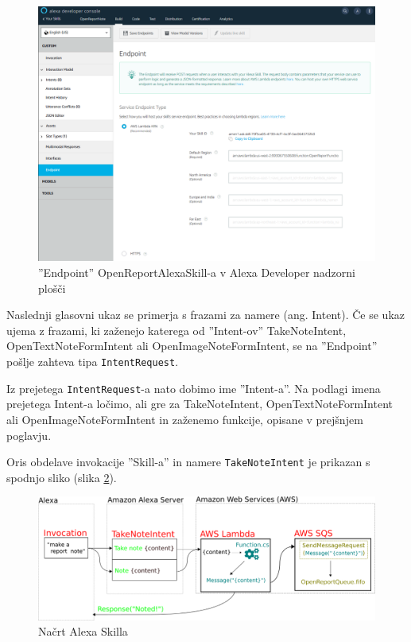 \documentclass[a4paper, 12pt]{book}
\begin{document}
\begin{figure}[H]
\begin{center}
\includegraphics[width=13cm]{skill_endpoint}
\end{center}
\caption{''Endpoint'' OpenReportAlexaSkill-a v Alexa Developer nadzorni plošči}
\label{skill_endpoint}
\end{figure}

Naslednji glasovni ukaz se primerja s frazami za namere (ang. Intent).
Če se ukaz ujema z frazami, ki zaženejo katerega od ''Intent-ov'' TakeNoteIntent, OpenTextNoteFormIntent ali OpenImageNoteFormIntent, se na ''Endpoint'' pošlje zahteva tipa \texttt{IntentRequest}.

Iz prejetega \texttt{IntentRequest}-a nato dobimo ime ''Intent-a''.
Na podlagi imena prejetega Intent-a ločimo, ali gre za TakeNoteIntent, OpenTextNoteFormIntent ali OpenImageNoteFormIntent in zaženemo funkcije, opisane v prejšnjem poglavju.

Oris obdelave invokacije ''Skill-a'' in namere \texttt{TakeNoteIntent} je prikazan s spodnjo sliko (slika \ref{skill}).
\begin{figure}[H]
\begin{center}
\includegraphics[width=13.5cm]{skill_2}
\end{center}
\caption{Načrt Alexa Skilla}
\label{skill}
\end{figure}
\end{document}
